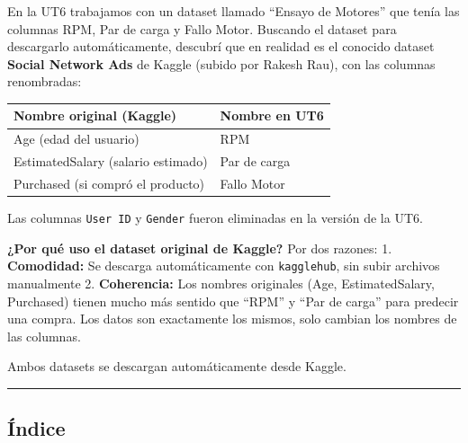 \documentclass[11pt]{article}
\begin{document}
En la UT6 trabajamos con un dataset llamado ``Ensayo de Motores'' que
tenía las columnas RPM, Par de carga y Fallo Motor. Buscando el dataset
para descargarlo automáticamente, descubrí que en realidad es el
conocido dataset \textbf{Social Network Ads} de Kaggle (subido por
Rakesh Rau), con las columnas renombradas:

{\def\LTcaptype{none} %
\begin{longtable}[]{@{}ll@{}}
\toprule\noalign{}
Nombre original (Kaggle) & Nombre en UT6 \\
\midrule\noalign{}
\endhead
\bottomrule\noalign{}
\endlastfoot
Age (edad del usuario) & RPM \\
EstimatedSalary (salario estimado) & Par de carga \\
Purchased (si compró el producto) & Fallo Motor \\
\end{longtable}
}

Las columnas \texttt{User\ ID} y \texttt{Gender} fueron eliminadas en la
versión de la UT6.

\textbf{¿Por qué uso el dataset original de Kaggle?} Por dos razones: 1.
\textbf{Comodidad:} Se descarga automáticamente con \texttt{kagglehub},
sin subir archivos manualmente 2. \textbf{Coherencia:} Los nombres
originales (Age, EstimatedSalary, Purchased) tienen mucho más sentido
que ``RPM'' y ``Par de carga'' para predecir una compra. Los datos son
exactamente los mismos, solo cambian los nombres de las columnas.

Ambos datasets se descargan automáticamente desde Kaggle.

\begin{center}\rule{0.5\linewidth}{0.5pt}\end{center}

\subsection{Índice}\label{uxedndice}
\end{document}
